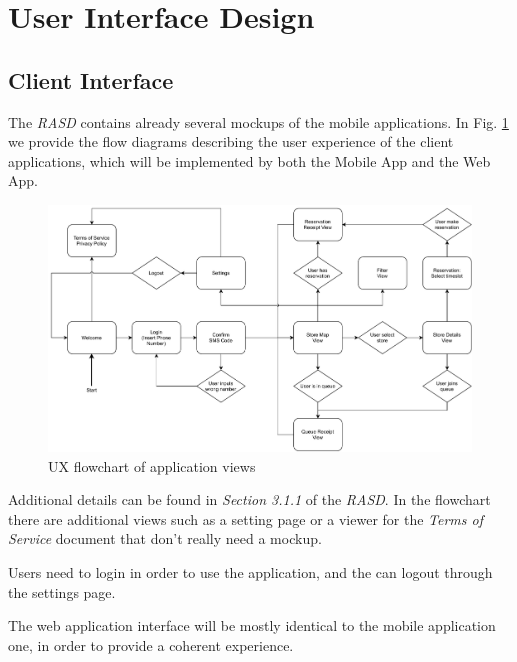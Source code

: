 
\section{User Interface Design}

\subsection{Client Interface}

The \emph{RASD} contains already several mockups of the mobile applications. In Fig. \ref{fig:ux_flowchart} we provide the flow diagrams describing the user experience of the client applications, which will be implemented by both the Mobile App and the Web App.

\begin{figure}[H]
    \includegraphics[width=\linewidth]{images/draw.io/ux_diagram.pdf}
    \caption{UX flowchart of application views}
    \label{fig:ux_flowchart}
\end{figure}

Additional details can be found in \emph{Section 3.1.1} of the \emph{RASD}.
In the flowchart there are additional views such as a setting page or a viewer for the \emph{Terms of Service} document that don't really need a mockup.

Users need to login in order to use the application, and the can logout through the settings page.

The web application interface will be mostly identical to the mobile application one, in order to provide a coherent experience.

